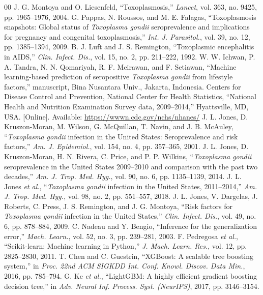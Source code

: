 \documentclass[conference]{IEEEtran}
\begin{document}
\begin{thebibliography}{00}
 J. G. Montoya and O. Liesenfeld, ``Toxoplasmosis,'' \emph{Lancet}, vol. 363, no. 9425, pp. 1965--1976, 2004.
 G. Pappas, N. Roussos, and M. E. Falagas, ``Toxoplasmosis snapshots: Global status of \emph{Toxoplasma gondii} seroprevalence and implications for pregnancy and congenital toxoplasmosis,'' \emph{Int. J. Parasitol.}, vol. 39, no. 12, pp. 1385--1394, 2009.
 B. J. Luft and J. S. Remington, ``Toxoplasmic encephalitis in AIDS,'' \emph{Clin. Infect. Dis.}, vol. 15, no. 2, pp. 211--222, 1992.
 W. W. Ichwan, P. A. Tandra, N. N. Qomariyah, R. F. Meirawan, and F. Setiawan, ``Machine learning-based prediction of seropositive \emph{Toxoplasma gondii} from lifestyle factors,'' manuscript, Bina Nusantara Univ., Jakarta, Indonesia.
 Centers for Disease Control and Prevention, National Center for Health Statistics, ``National Health and Nutrition Examination Survey data, 2009--2014,'' Hyattsville, MD, USA. [Online]. Available: \url{https://wwwn.cdc.gov/nchs/nhanes/}
 J. L. Jones, D. Kruszon-Moran, M. Wilson, G. McQuillan, T. Navin, and J. B. McAuley, ``\emph{Toxoplasma gondii} infection in the United States: Seroprevalence and risk factors,'' \emph{Am. J. Epidemiol.}, vol. 154, no. 4, pp. 357--365, 2001.
 J. L. Jones, D. Kruszon-Moran, H. N. Rivera, C. Price, and P. P. Wilkins, ``\emph{Toxoplasma gondii} seroprevalence in the United States 2009--2010 and comparison with the past two decades,'' \emph{Am. J. Trop. Med. Hyg.}, vol. 90, no. 6, pp. 1135--1139, 2014.
 J. L. Jones \emph{et al.}, ``\emph{Toxoplasma gondii} infection in the United States, 2011--2014,'' \emph{Am. J. Trop. Med. Hyg.}, vol. 98, no. 2, pp. 551--557, 2018.
 J. L. Jones, V. Dargelas, J. Roberts, C. Press, J. S. Remington, and J. G. Montoya, ``Risk factors for \emph{Toxoplasma gondii} infection in the United States,'' \emph{Clin. Infect. Dis.}, vol. 49, no. 6, pp. 878--884, 2009.
 C. Nadeau and Y. Bengio, ``Inference for the generalization error,'' \emph{Mach. Learn.}, vol. 52, no. 3, pp. 239--281, 2003.
 F. Pedregosa \emph{et al.}, ``Scikit-learn: Machine learning in Python,'' \emph{J. Mach. Learn. Res.}, vol. 12, pp. 2825--2830, 2011.
 T. Chen and C. Guestrin, ``XGBoost: A scalable tree boosting system,'' in \emph{Proc. 22nd ACM SIGKDD Int. Conf. Knowl. Discov. Data Min.}, 2016, pp. 785--794.
 G. Ke \emph{et al.}, ``LightGBM: A highly efficient gradient boosting decision tree,'' in \emph{Adv. Neural Inf. Process. Syst. (NeurIPS)}, 2017, pp. 3146--3154.

\end{thebibliography}
\end{document}
